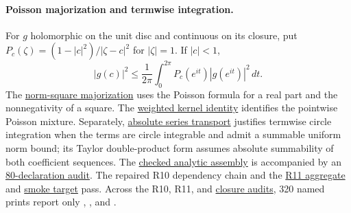 \documentclass[11pt]{article}
\begin{document}
\paragraph{Poisson majorization and termwise integration.}
For $g$ holomorphic on the unit disc and continuous on its closure, put
$P_c(\zeta)=(1-|c|^2)/|\zeta-c|^2$ for $|\zeta|=1$.  If $|c|<1$,
\[
 |g(c)|^2\le\frac1{2\pi}\int_0^{2\pi}
 P_c(e^{it})|g(e^{it})|^2\,dt.
\]
The \href{https://github.com/wcook04/plectis-erdos/blob/d4fed71423840f70f10edf27b9ad27c22fc4f49a/ErdosProblems/Erdos1041/PoissonNormSquare.lean#L114}{norm-square majorization}
uses the Poisson formula for a real part and the nonnegativity of a square.
The \href{https://github.com/wcook04/plectis-erdos/blob/d4fed71423840f70f10edf27b9ad27c22fc4f49a/ErdosProblems/Erdos1041/PoissonKernelBridge.lean#L27}{weighted kernel identity}
identifies the pointwise Poisson mixture.  Separately,
\href{https://github.com/wcook04/plectis-erdos/blob/d4fed71423840f70f10edf27b9ad27c22fc4f49a/ErdosProblems/Erdos1041/CircleSeriesTransport.lean#L49}{absolute series transport}
justifies termwise circle integration when the terms are circle integrable
and admit a summable uniform norm bound; its Taylor double-product form
assumes absolute summability of both coefficient sequences.
The
\href{https://github.com/wcook04/plectis-erdos/blob/3f1a5e9b284b9c3348eebd549e24c2f3972606ae/ErdosProblems/Erdos1041/PaperAnalyticR10.lean\#L1}{checked analytic assembly}
is accompanied by an
\href{https://github.com/wcook04/plectis-erdos/blob/3f1a5e9b284b9c3348eebd549e24c2f3972606ae/ErdosProblems/Erdos1041/PaperAnalyticR10Audit.lean\#L1}{80-declaration audit}.
The repaired R10 dependency chain and the
\href{https://github.com/wcook04/plectis-erdos/blob/3f1a5e9b284b9c3348eebd549e24c2f3972606ae/ErdosProblems/Erdos1041/PaperAnalyticR11.lean\#L1}{R11 aggregate}
and
\href{https://github.com/wcook04/plectis-erdos/blob/3f1a5e9b284b9c3348eebd549e24c2f3972606ae/ErdosProblems/Erdos1041/PaperAnalyticSmokeR11.lean\#L1}{smoke target}
pass. Across the R10, R11, and
\href{https://github.com/wcook04/plectis-erdos/blob/3f1a5e9b284b9c3348eebd549e24c2f3972606ae/ErdosProblems/Erdos1041/PaperAnalyticClosureAuditR11.lean\#L1}{closure audits},
320 named prints report only , , and
.
\end{document}
